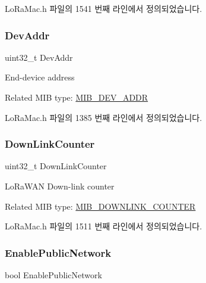 Lo\+Ra\+Mac.\+h 파일의 1541 번째 라인에서 정의되었습니다.

\mbox{\label{unionu_mib_param_a8644153b1c46ffcaeb2b44b5544a2c1a}} 
\subsubsection{\texorpdfstring{Dev\+Addr}{DevAddr}}
{\footnotesize\ttfamily uint32\+\_\+t Dev\+Addr}

End-\/device address

Related M\+IB type\+: \mbox{\hyperlink{group___l_o_r_a_m_a_c_gga32ea83d13a3f5bb4b3ec2ace2319ab61ab1459b05690ffa347a71393006b526ac}{M\+I\+B\+\_\+\+D\+E\+V\+\_\+\+A\+D\+DR}} 

Lo\+Ra\+Mac.\+h 파일의 1385 번째 라인에서 정의되었습니다.

\mbox{\label{unionu_mib_param_a7a566925baf83b1b3da9209dfa4bb79a}} 
\subsubsection{\texorpdfstring{Down\+Link\+Counter}{DownLinkCounter}}
{\footnotesize\ttfamily uint32\+\_\+t Down\+Link\+Counter}

Lo\+Ra\+W\+AN Down-\/link counter

Related M\+IB type\+: \mbox{\hyperlink{group___l_o_r_a_m_a_c_gga32ea83d13a3f5bb4b3ec2ace2319ab61ae75b53deee33594312d1d2987c24b698}{M\+I\+B\+\_\+\+D\+O\+W\+N\+L\+I\+N\+K\+\_\+\+C\+O\+U\+N\+T\+ER}} 

Lo\+Ra\+Mac.\+h 파일의 1511 번째 라인에서 정의되었습니다.

\mbox{\label{unionu_mib_param_aff3bd8c7ac1d2fe36ed22c15c25273aa}} 
\subsubsection{\texorpdfstring{Enable\+Public\+Network}{EnablePublicNetwork}}
{\footnotesize\ttfamily bool Enable\+Public\+Network}

